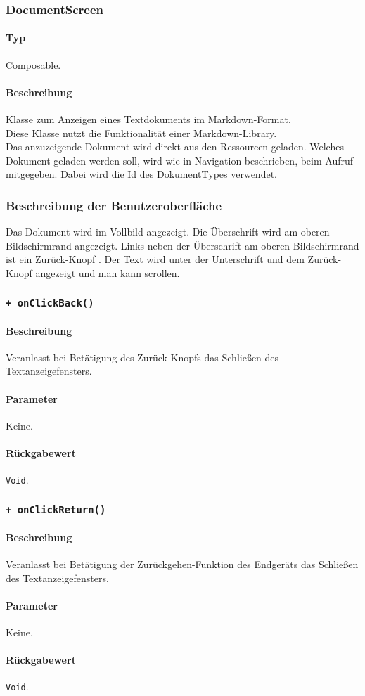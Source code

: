 \subsubsection{DocumentScreen}
\paragraph*{Typ}
Composable.
\paragraph*{Beschreibung}
Klasse zum Anzeigen eines Textdokuments im Markdown-Format.\\
Diese Klasse nutzt die Funktionalität einer Markdown-Library.\\
Das anzuzeigende Dokument wird direkt aus den Ressourcen geladen.
Welches Dokument geladen werden soll, wird wie in Navigation beschrieben, beim Aufruf mitgegeben. 
Dabei wird die Id des DokumentTypes verwendet.

\subsubsection*{Beschreibung der Benutzeroberfläche}
Das Dokument wird im Vollbild angezeigt.
Die Überschrift wird am oberen Bildschirmrand angezeigt.
Links neben der Überschrift am oberen Bildschirmrand ist ein \dq Zurück-Knopf \dq{}.
Der Text wird unter der Unterschrift und dem \dq Zurück-Knopf \dq{} angezeigt und man kann scrollen.

\subsubsection*{\texttt{+ onClickBack()}}%
\paragraph*{Beschreibung}
Veranlasst bei Betätigung des \dq Zurück-Knopfs \dq{} das Schließen des Textanzeigefensters.
\paragraph*{Parameter}
Keine.
\paragraph*{Rückgabewert}
\texttt{Void}.

\subsubsection*{\texttt{+ onClickReturn()}}%
\paragraph*{Beschreibung}
Veranlasst bei Betätigung der Zurückgehen-Funktion des Endgeräts das Schließen des Textanzeigefensters.
\paragraph*{Parameter}
Keine.
\paragraph*{Rückgabewert}
\texttt{Void}.
